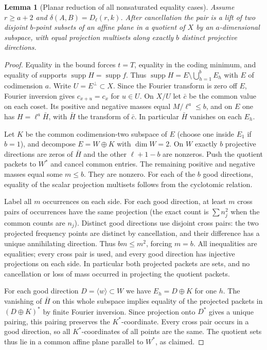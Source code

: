 \documentclass[11pt]{article}
\newtheorem{lemma}[theorem]{Lemma}
\theoremstyle{remark}\newtheorem{remark}[theorem]{Remark}
\newcommand{\supp}{\operatorname{supp}}
\begin{document}
\begin{lemma}[Planar reduction of all nonsaturated equality cases]\label{lem:plane}
Assume $r\ge a+2$ and $\delta(A,B)=D_\ell(r,k)$. After cancellation the pair is a lift of two disjoint $b$-point subsets of an affine plane in a quotient of $X$ by an $a$-dimensional subspace, with equal projection multisets along exactly $b$ distinct projective directions.
\end{lemma}
\begin{proof}
Equality in the bound forces $t=T$, equality in the coding minimum, and equality of supports $\supp H=\supp f$. Thus $\supp H=E\setminus\bigcup_{h=1}^b E_h$ with $E$ of codimension $a$. Write $U=E^\perp\subset X$. Since the Fourier transform is zero off $E$, Fourier inversion gives $c_{x+u}=c_x$ for $u\in U$. On $X/U$ let $\bar c$ be the common value on each coset. Its positive and negative masses equal $M/\ell^a\le b$, and on $E$ one has $H=\ell^a\bar H$, with $\bar H$ the transform of $\bar c$. In particular $\bar H$ vanishes on each $E_h$.

Let $K$ be the common codimension-two subspace of $E$ (choose one inside $E_1$ if $b=1$), and decompose $E=W\oplus K$ with $\dim W=2$. On $W$ exactly $b$ projective directions are zeros of $\bar H$ and the other $\ell+1-b$ are nonzeros. Push the quotient packets to $W^*$ and cancel common entries. The remaining positive and negative masses equal some $m\le b$. They are nonzero. For each of the $b$ good directions, equality of the scalar projection multisets follows from the cyclotomic relation.

Label all $m$ occurrences on each side. For each good direction, at least $m$ cross pairs of occurrences have the same projection (the exact count is $\sum n_j^2$ when the common counts are $n_j$). Distinct good directions use disjoint cross pairs: the two projected frequency points are distinct by cancellation, and their difference has a unique annihilating direction. Thus $bm\le m^2$, forcing $m=b$. All inequalities are equalities; every cross pair is used, and every good direction has injective projections on each side. In particular both projected packets are sets, and no cancellation or loss of mass occurred in projecting the quotient packets.

For each good direction $D=\langle w\rangle\subset W$ we have $E_h=D\oplus K$ for one $h$. The vanishing of $\bar H$ on this whole subspace implies equality of the projected packets in $(D\oplus K)^*$ by finite Fourier inversion. Since projection onto $D^*$ gives a unique pairing, this pairing preserves the $K^*$-coordinate. Every cross pair occurs in a good direction, so all $K^*$-coordinates of all points are the same. The quotient sets thus lie in a common affine plane parallel to $W^*$, as claimed.
\end{proof}
\end{document}
